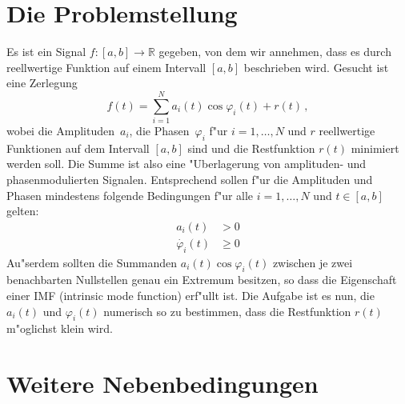 \documentclass[a4paper]{scrartcl}
\newcommand{\R}{{\mathbb{R}}}
\newcommand{\pphi}{{\varphi}}
\begin{document}

\section{Die Problemstellung}

Es ist ein Signal $f:[a,b]\to\R$ gegeben, von dem wir annehmen, dass es durch reellwertige Funktion auf einem Intervall $[a,b]$ beschrieben wird. 
Gesucht ist eine Zerlegung
$$ f(t) = \sum_{i=1}^N a_i(t)\cos\pphi_i(t) + r(t)\,, $$
wobei die Amplituden~$a_i$, die Phasen~$\pphi_i$ f"ur $i=1,\dotsc,N$ und $r$ reellwertige Funktionen auf dem Intervall $[a,b]$ sind und die Restfunktion $r(t)$ minimiert werden soll. 
Die Summe ist also eine "Uberlagerung von amplituden- und phasenmodulierten Signalen. 
Entsprechend sollen f"ur die Amplituden und Phasen mindestens folgende Bedingungen f"ur alle $i=1,\dotsc,N$ und $t\in[a,b]$ gelten:
\begin{align*}
  a_i(t) &> 0 \\
  \dot{\pphi_i}(t) &\ge 0
\end{align*}
Au"serdem sollten die Summanden $a_i(t)\cos\pphi_i(t)$ zwischen je zwei benachbarten Nullstellen genau ein Extremum besitzen, so dass die Eigenschaft einer IMF (intrinsic mode function) erf"ullt ist. 
Die Aufgabe ist es nun, die $a_i(t)$ und $\pphi_i(t)$ numerisch so zu bestimmen, dass die Restfunktion $r(t)$ m"oglichst klein wird. 


\section{Weitere Nebenbedingungen}
\end{document}
